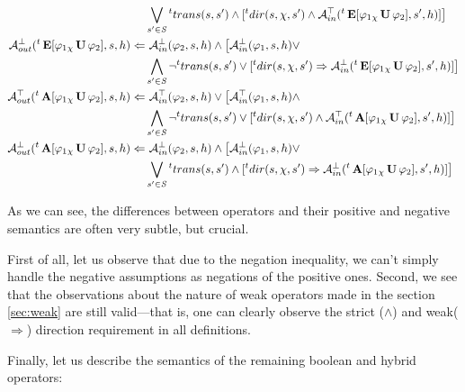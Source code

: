 \begin{align*}
	& \bigvee_{s' \in \mathit{S}} {}^{t}trans(s,s') \land [{}^{t}dir(s, \chi, s') \land \mathcal{A}^\top_{in}({}^{t}\operatorname{\mathbf{E}}[ \varphi_1 {}_{\chi}\operatorname{\mathbf{U}} \varphi_2], s', h)] \big] \\
	\mathcal{A}^\bot_{out}({}^{t}\operatorname{\mathbf{E}}[ \varphi_1 {}_{\chi}\operatorname{\mathbf{U}} \varphi_2], s, h) \Leftarrow &\ \mathcal{A}^\bot_{in}(\varphi_2, s, h) \land \big[ \mathcal{A}^\bot_{in}(\varphi_1, s, h) \lor \\
	& \bigwedge_{s' \in \mathit{S}} \neg{}^{t}trans(s,s') \lor [{}^{t}dir(s, \chi, s') \Rightarrow \mathcal{A}^\bot_{in}({}^{t}\operatorname{\mathbf{E}}[ \varphi_1 {}_{\chi}\operatorname{\mathbf{U}} \varphi_2], s', h)] \big] \\
	\mathcal{A}^\top_{out}({}^{t}\operatorname{\mathbf{A}}[ \varphi_1 {}_{\chi}\operatorname{\mathbf{U}} \varphi_2], s, h) \Leftarrow &\ \mathcal{A}^\top_{in}(\varphi_2, s, h) \lor \big[ \mathcal{A}^\top_{in}(\varphi_1, s, h) \land \\
	& \bigwedge_{s' \in \mathit{S}} \neg{}^{t}trans(s,s') \lor [{}^{t}dir(s, \chi, s') \land \mathcal{A}^\top_{in}({}^{t}\operatorname{\mathbf{A}}[ \varphi_1 {}_{\chi}\operatorname{\mathbf{U}} \varphi_2], s', h)] \big] \\
	\mathcal{A}^\bot_{out}({}^{t}\operatorname{\mathbf{A}}[ \varphi_1 {}_{\chi}\operatorname{\mathbf{U}} \varphi_2], s, h) \Leftarrow &\ \mathcal{A}^\bot_{in}(\varphi_2, s, h) \land \big[ \mathcal{A}^\bot_{in}(\varphi_1, s, h) \lor \\
	& \bigvee_{s' \in \mathit{S}} {}^{t}trans(s,s') \land [{}^{t}dir(s, \chi, s') \Rightarrow \mathcal{A}^\bot_{in}({}^{t}\operatorname{\mathbf{A}}[ \varphi_1 {}_{\chi}\operatorname{\mathbf{U}} \varphi_2], s', h)] \big] \\
\end{align*}

As we can see, the differences between operators and their positive and negative semantics are often very subtle, but crucial.

First of all, let us observe that due to the negation inequality, we can't simply handle the negative assumptions as negations of the positive ones. Second, we see that the observations about the nature of weak operators made in the section \ref{sec:weak} are still valid—that is, one can clearly observe the strict ($\land$) and weak($\Rightarrow$) direction requirement in all definitions.

Finally, let us describe the semantics of the remaining boolean and hybrid operators:

